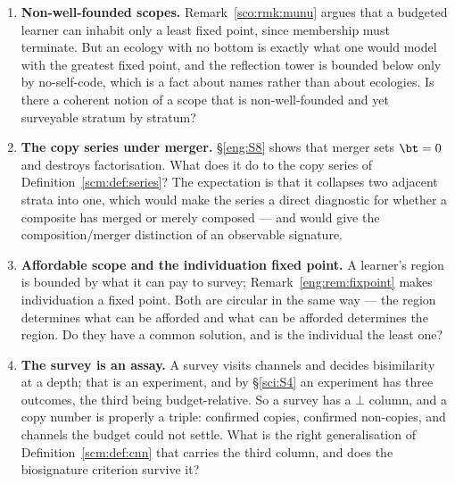 \begin{enumerate}[label=\textbf{Gap \arabic*.}, leftmargin=*, itemsep=8pt]
  \item \textbf{Non-well-founded scopes.}
        Remark~\ref{sco:rmk:munu} argues that a budgeted learner can
        inhabit only a least fixed point, since membership must
        terminate.
        But an ecology with no bottom is exactly what one would model
        with the greatest fixed point, and the reflection tower is
        bounded below only by no-self-code, which is a fact about
        names rather than about ecologies.
        Is there a coherent notion of a scope that is
        non-well-founded and yet surveyable stratum by stratum?

  \item \textbf{The copy series under merger.}
        \S\ref{eng:S8} shows that merger sets $\bt = 0$ and destroys
        factorisation.
        What does it do to the copy series of
        Definition~\ref{scm:def:series}?
        The expectation is that it collapses two adjacent strata into
        one, which would make the series a direct diagnostic for
        whether a composite has merged or merely composed --- and
        would give the composition/merger distinction of \chComp an
        observable signature.

  \item \textbf{Affordable scope and the individuation fixed point.}
        A learner's region is bounded by what it can pay to survey;
        Remark~\ref{eng:rem:fixpoint} makes individuation a fixed
        point.
        Both are circular in the same way --- the region determines
        what can be afforded and what can be afforded determines the
        region.
        Do they have a common solution, and is the individual the
        least one?

  \item \textbf{The survey is an assay.}
        A survey visits channels and decides bisimilarity at a depth;
        that is an experiment, and by \S\ref{sci:S4} an experiment has
        three outcomes, the third being budget-relative.
        So a survey has a $\bot$ column, and a copy number is properly
        a triple: confirmed copies, confirmed non-copies, and channels
        the budget could not settle.
        What is the right generalisation of
        Definition~\ref{scm:def:cnn} that carries the third column,
        and does the biosignature criterion survive it?

\end{enumerate}

